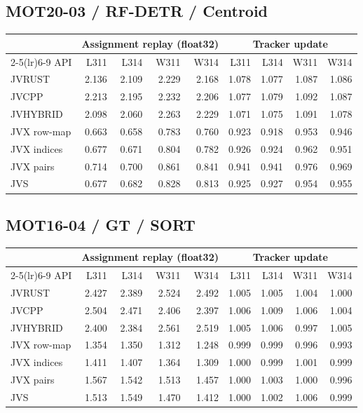 \subsection*{MOT20-03 / RF-DETR / Centroid}
\begin{center}\small
\begin{tabular}{@{}lrrrrrrrr@{}}
\toprule
 & \multicolumn{4}{c}{Assignment replay (float32)} & \multicolumn{4}{c}{Tracker update} \\
\cmidrule(lr){2-5}\cmidrule(lr){6-9}
API & L311 & L314 & W311 & W314 & L311 & L314 & W311 & W314 \\
\midrule
JVRUST & 2.136 & 2.109 & 2.229 & 2.168 & 1.078 & 1.077 & 1.087 & 1.086 \\
JVCPP & 2.213 & 2.195 & 2.232 & 2.206 & 1.077 & 1.079 & 1.092 & 1.087 \\
JVHYBRID & 2.098 & 2.060 & 2.263 & 2.229 & 1.071 & 1.075 & 1.091 & 1.078 \\
JVX row-map & 0.663 & 0.658 & 0.783 & 0.760 & 0.923 & 0.918 & 0.953 & 0.946 \\
JVX indices & 0.677 & 0.671 & 0.804 & 0.782 & 0.926 & 0.924 & 0.962 & 0.951 \\
JVX pairs & 0.714 & 0.700 & 0.861 & 0.841 & 0.941 & 0.941 & 0.976 & 0.969 \\
JVS & 0.677 & 0.682 & 0.828 & 0.813 & 0.925 & 0.927 & 0.954 & 0.955 \\
\bottomrule
\end{tabular}
\end{center}
\clearpage
\subsection*{MOT16-04 / GT / SORT}
\begin{center}\small
\begin{tabular}{@{}lrrrrrrrr@{}}
\toprule
 & \multicolumn{4}{c}{Assignment replay (float32)} & \multicolumn{4}{c}{Tracker update} \\
\cmidrule(lr){2-5}\cmidrule(lr){6-9}
API & L311 & L314 & W311 & W314 & L311 & L314 & W311 & W314 \\
\midrule
JVRUST & 2.427 & 2.389 & 2.524 & 2.492 & 1.005 & 1.005 & 1.004 & 1.000 \\
JVCPP & 2.504 & 2.471 & 2.406 & 2.397 & 1.006 & 1.009 & 1.006 & 1.004 \\
JVHYBRID & 2.400 & 2.384 & 2.561 & 2.519 & 1.005 & 1.006 & 0.997 & 1.005 \\
JVX row-map & 1.354 & 1.350 & 1.312 & 1.248 & 0.999 & 0.999 & 0.996 & 0.993 \\
JVX indices & 1.411 & 1.407 & 1.364 & 1.309 & 1.000 & 0.999 & 1.001 & 0.999 \\
JVX pairs & 1.567 & 1.542 & 1.513 & 1.457 & 1.000 & 1.003 & 1.000 & 0.996 \\
JVS & 1.513 & 1.549 & 1.470 & 1.412 & 1.000 & 1.002 & 1.006 & 0.999 \\
\bottomrule
\end{tabular}
\end{center}
